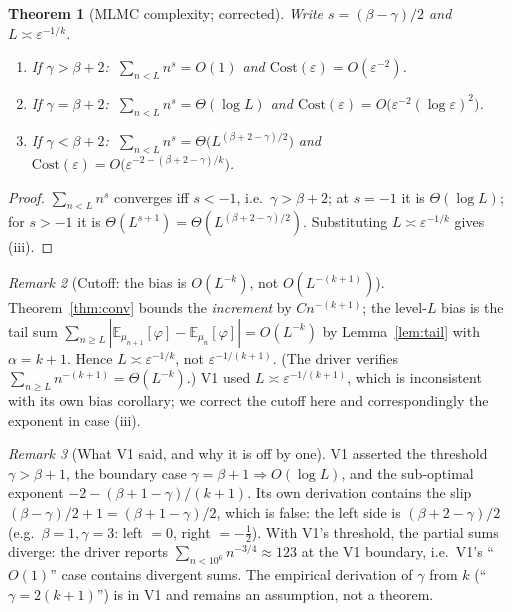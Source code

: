 \documentclass[11pt]{article}
\newtheorem{theorem}{Theorem}[section]
\theoremstyle{definition}
\theoremstyle{remark}
\newtheorem{remark}[theorem]{Remark}
\newcommand{\E}{\mathbb{E}}
\begin{document}
\begin{theorem}[MLMC complexity; corrected]\label{thm:mlmc}
Write $s=(\beta-\gamma)/2$ and $L\asymp\varepsilon^{-1/k}$.
\begin{enumerate}
  \item If $\gamma>\beta+2$: $\ \sum_{n<L}n^{s}=O(1)$ and $\mathrm{Cost}(\varepsilon)=O(\varepsilon^{-2})$.
  \item If $\gamma=\beta+2$: $\ \sum_{n<L}n^{s}=\Theta(\log L)$ and
        $\mathrm{Cost}(\varepsilon)=O\bigl(\varepsilon^{-2}(\log\varepsilon)^2\bigr)$.
  \item If $\gamma<\beta+2$: $\ \sum_{n<L}n^{s}=\Theta\bigl(L^{(\beta+2-\gamma)/2}\bigr)$ and
        $\mathrm{Cost}(\varepsilon)=O\bigl(\varepsilon^{-2-(\beta+2-\gamma)/k}\bigr)$.
\end{enumerate}
\end{theorem}
\begin{proof}
$\sum_{n<L}n^{s}$ converges iff $s<-1$, i.e.\ $\gamma>\beta+2$; at $s=-1$ it is $\Theta(\log L)$;
for $s>-1$ it is $\Theta(L^{s+1})=\Theta(L^{(\beta+2-\gamma)/2})$. Substituting
$L\asymp\varepsilon^{-1/k}$ gives (iii).
\end{proof}
\begin{remark}[Cutoff: the bias is $O(L^{-k})$, not $O(L^{-(k+1)})$]
Theorem~\ref{thm:conv} bounds the \emph{increment} by $Cn^{-(k+1)}$; the level-$L$ bias is the tail
sum $\sum_{n\ge L}|\E_{\mu_{n+1}}[\varphi]-\E_{\mu_n}[\varphi]|=O(L^{-k})$ by Lemma~\ref{lem:tail}
with $\alpha=k+1$. Hence $L\asymp\varepsilon^{-1/k}$, not $\varepsilon^{-1/(k+1)}$. (The driver
verifies $\sum_{n\ge L}n^{-(k+1)}=\Theta(L^{-k})$.) V1 used $L\asymp\varepsilon^{-1/(k+1)}$, which is
inconsistent with its own bias corollary; we correct the cutoff here and correspondingly the
exponent in case (iii).
\end{remark}

\begin{remark}[What V1 said, and why it is off by one]
V1 asserted the threshold $\gamma>\beta+1$, the boundary case $\gamma=\beta+1\Rightarrow O(\log L)$,
and the sub-optimal exponent $-2-(\beta+1-\gamma)/(k+1)$. Its own derivation contains the slip
$(\beta-\gamma)/2+1=(\beta+1-\gamma)/2$, which is false: the left side is
$(\beta+2-\gamma)/2$ (e.g.\ $\beta=1,\gamma=3$: left $=0$, right $=-\tfrac12$). With V1's threshold,
the partial sums diverge: the driver reports $\sum_{n<10^6}n^{-3/4}\approx123$ at the V1 boundary,
i.e.\ V1's ``$O(1)$'' case contains divergent sums. The empirical derivation of $\gamma$ from $k$
(``$\gamma=2(k+1)$'') is in V1 and remains an assumption, not a theorem.
\end{remark}
\end{document}
